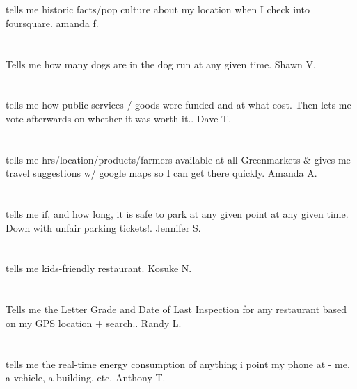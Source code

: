 \section{} tells me historic facts/pop culture about my location when I check into foursquare. amanda f.
\section{}Tells me how many dogs are in the dog run at any given time. Shawn V.
\section{} tells me how public services / goods were funded and at what cost. Then lets me vote afterwards on whether it was worth it.. Dave T.
\section{} tells me hrs/location/products/farmers available at all Greenmarkets \& gives me travel suggestions w/ google maps so I can get there quickly. Amanda A.
\section{} tells me if,  and how long,  it is safe to park at any given point at any given time. Down with unfair parking tickets!. Jennifer S.
\section{}tells me kids-friendly restaurant. Kosuke N.
\section{}  Tells me the Letter Grade and Date of Last Inspection for any restaurant based on my GPS location + search.. Randy L.
\section{}tells me the real-time energy consumption of anything i point my phone at - me,  a vehicle,  a building,  etc. Anthony T.
